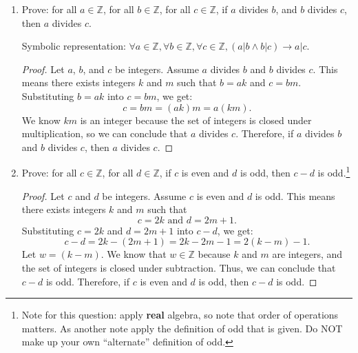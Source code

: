 \documentclass{article}
\newcommand\Z{\mathbb{Z}}
\begin{document}
\begin{enumerate}
\begin{proof}
          \end{proof}

          \newpage

    \item Prove: for all $a \in \mathbb{Z}$, for all $b \in \mathbb{Z}$, for all $c \in
              \mathbb{Z}$, if $a$ divides $b$, and $b$ divides $c$, then $a$ divides $c$.

              Symbolic representation: $\forall a \in \Z, \forall b \in \Z, \forall c \in \Z, (a|b \land b|c) \rightarrow a|c$.
    
          \begin{proof}
              Let $a$, $b$, and $c$ be integers. Assume $a$ divides $b$ and $b$ divides $c$. This means there exists integers $k$ and $m$ such that $b = ak$ and $c = bm$.
              Substituting $b = ak$ into $c = bm$, we get:
              \[
                c = bm = (ak)m = a(km).
              \]
              We know $km$ is an integer because the set of integers is closed under multiplication, so we can conclude that $a$ divides $c$. Therefore, if $a$ divides $b$ and $b$ divides $c$, then $a$ divides $c$.
          \end{proof}

          \newpage

    \item Prove: for all $c \in \mathbb{Z}$, for all $d \in \mathbb{Z}$, if $c$ is even
          and $d$ is odd, then $c-d$ is odd.\footnote{Note for this question: apply {\bf
                      real} algebra, so note that order of operations matters. As another note apply
              the definition of odd that is given. Do NOT make up your own ``alternate''
              definition of odd.}

          \begin{proof}
              Let $c$ and $d$ be integers. Assume $c$ is even and $d$ is odd. This means there exists integers $k$ and $m$ such that
              \[
              c = 2k \text{ and } d = 2m + 1.
            \]
              Substituting $c = 2k$ and $d = 2m + 1$ into $c - d$, we get:
              \[
              c - d = 2k - (2m + 1) = 2k - 2m - 1 = 2(k - m) - 1.
              \]
              Let $w = (k - m).$ We know that $w \in \mathbb{Z}$ because $k$ and $m$ are integers, and the set of integers is closed under subtraction. Thus, we can conclude that $c - d$ is odd. Therefore, if $c$ is even and $d$ is odd, then $c - d$ is odd.
          \end{proof}


\end{enumerate}
\end{document}
